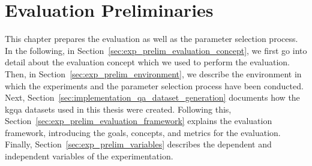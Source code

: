 \chapter{Evaluation Preliminaries}
\label{ch:experimentation_preliminaries}

This chapter prepares the evaluation as well as the parameter selection process. In the following, in Section~\ref{sec:exp_prelim_evaluation_concept}, we first go into detail about the evaluation concept which we used to perform the evaluation. Then, in Section~\ref{sec:exp_prelim_environment}, we describe the environment in which the experiments and the parameter selection process have been conducted. Next, Section~\ref{sec:implementation_qa_dataset_generation} documents how the \gls{kgqa} datasets used in this thesis were created. Following this, Section~\ref{sec:exp_prelim_evaluation_framework} explains the evaluation framework, introducing the goals, concepts, and metrics for the evaluation. Finally, Section~\ref{sec:exp_prelim_variables} describes the dependent and independent variables of the experimentation.








